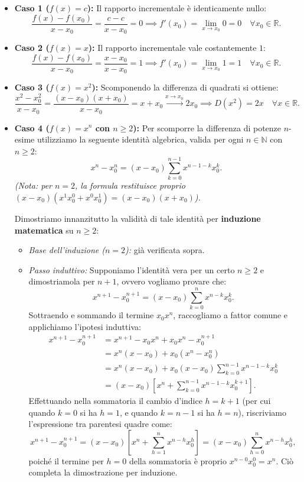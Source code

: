\begin{itemize}
    \item \textbf{Caso 1 ($f(x) = c$):} Il rapporto incrementale è identicamente nullo:
    \[
        \frac{f(x) - f(x_0)}{x - x_0} = \frac{c - c}{x - x_0} = 0 \implies f'(x_0) = \lim_{x \to x_0} 0 = 0 \quad \forall x_0 \in \mathbb{R}.
    \]

    \item \textbf{Caso 2 ($f(x) = x$):} Il rapporto incrementale vale costantemente $1$:
    \[
        \frac{f(x) - f(x_0)}{x - x_0} = \frac{x - x_0}{x - x_0} = 1 \implies f'(x_0) = \lim_{x \to x_0} 1 = 1 \quad \forall x_0 \in \mathbb{R}.
    \]

    \item \textbf{Caso 3 ($f(x) = x^2$):} Scomponendo la differenza di quadrati si ottiene:
    \[
        \frac{x^2 - x_0^2}{x - x_0} = \frac{(x - x_0)(x + x_0)}{x - x_0} = x + x_0 \xrightarrow{x \to x_0} 2x_0 \implies D(x^2) = 2x \quad \forall x \in \mathbb{R}.
    \]

    \item \textbf{Caso 4 ($f(x) = x^n$ con $n \ge 2$):} Per scomporre la differenza di potenze $n$-esime utilizziamo la seguente identità algebrica, valida per ogni $n \in \mathbb{N}$ con $n \ge 2$:
    \[
        x^n - x_0^n = (x - x_0) \sum_{k=0}^{n-1} x^{n-1-k} x_0^k.
    \]
    \emph{(Nota: per $n=2$, la formula restituisce proprio $(x-x_0)(x^1 x_0^0 + x^0 x_0^1) = (x-x_0)(x+x_0)$).}

    Dimostriamo innanzitutto la validità di tale identità per \textbf{induzione matematica} su $n \ge 2$:
    \begin{itemize}
        \item \emph{Base dell'induzione ($n=2$):} già verificata sopra.
        \item \emph{Passo induttivo:} Supponiamo l'identità vera per un certo $n \ge 2$ e dimostriamola per $n+1$, ovvero vogliamo provare che:
        \[
            x^{n+1} - x_0^{n+1} = (x - x_0) \sum_{k=0}^{n} x^{n-k} x_0^k.
        \]
        Sottraendo e sommando il termine $x_0 x^n$, raccogliamo a fattor comune e applichiamo l'ipotesi induttiva:
        \begin{align*}
            x^{n+1} - x_0^{n+1} &= x^{n+1} - x_0 x^n + x_0 x^n - x_0^{n+1} \\
            &= x^n(x - x_0) + x_0(x^n - x_0^n) \\
            &= x^n(x - x_0) + x_0 (x - x_0) \sum_{k=0}^{n-1} x^{n-1-k} x_0^k \\
            &= (x - x_0) \left[ x^n + \sum_{k=0}^{n-1} x^{n-1-k} x_0^{k+1} \right].
        \end{align*}
        Effettuando nella sommatoria il cambio d'indice $h = k + 1$ (per cui quando $k=0$ si ha $h=1$, e quando $k=n-1$ si ha $h=n$), riscriviamo l'espressione tra parentesi quadre come:
        \[
            x^{n+1} - x_0^{n+1} = (x - x_0) \left[ x^n + \sum_{h=1}^{n} x^{n-h} x_0^h \right] = (x - x_0) \sum_{h=0}^{n} x^{n-h} x_0^h,
        \]
        poiché il termine per $h=0$ della sommatoria è proprio $x^{n-0} x_0^0 = x^n$. Ciò completa la dimostrazione per induzione.
    \end{itemize}


\end{itemize}
